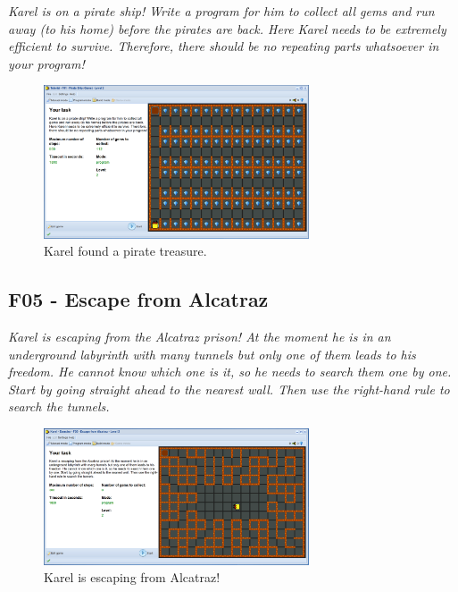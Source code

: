 \documentclass[article,A4,12pt]{llncs}
\begin{document}
{\em Karel is on a pirate ship! Write a program for him to collect all 
gems and run away (to his home) before the pirates are back. Here Karel 
needs to be extremely efficient to survive. Therefore, there should be 
no repeating parts whatsoever in your program!}


\begin{figure}[!ht]
\begin{center}
\includegraphics[width=0.7\textwidth]{img/f04.png}
\end{center}
\vspace{-4mm}
\caption{Karel found a pirate treasure.}
\label{fig:f04}
\vspace{-10mm}
\end{figure}
\noindent



\subsection{F05 - Escape from Alcatraz}

{\em Karel is escaping from the Alcatraz prison! At the moment he is in an underground labyrinth with many tunnels but only one of them leads to his freedom. He cannot know which one is it, so he needs to search them one by one. Start by going straight ahead to the nearest wall. Then use the right-hand rule to search the tunnels.}


\begin{figure}[!ht]
\begin{center}
\includegraphics[width=0.7\textwidth]{img/f05.png}
\end{center}
\vspace{-4mm}
\caption{Karel is escaping from Alcatraz!}
\label{fig:f05}
\vspace{-10mm}
\end{figure}
\noindent
\end{document}

